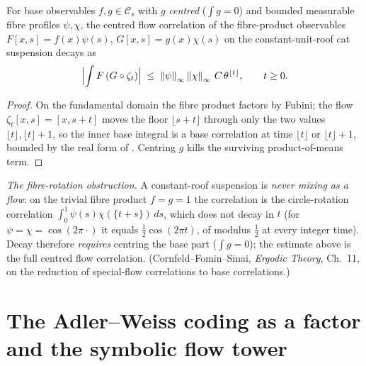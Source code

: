 \begin{theorem}\label{catSuspensionDecay_fourierDecay}
  \leanok
  For base observables \(f, g\in\mathcal C_s\) with \(g\) \emph{centred} (\(\int g = 0\)) and bounded
  measurable fibre profiles \(\psi, \chi\), the centred flow correlation of the fibre-product
  observables \(F[x,s] = f(x)\psi(s)\), \(G[x,s] = g(x)\chi(s)\) on the constant-unit-roof cat
  suspension decays as
  \[
    \Bigl\lvert \int F\,(G\circ\zeta_t) \Bigr\rvert
      \;\le\; \left\lVert \psi \right\rVert_\infty\left\lVert \chi \right\rVert_\infty\, C\,\theta^{\lfloor t\rfloor}, \qquad t\ge 0.
  \]
\end{theorem}
\begin{proof}\leanok
  On the fundamental domain the fibre product factors by Fubini; the flow \(\zeta_t[x,s] = [x, s+t]\)
  moves the floor \(\lfloor s+t\rfloor\) through only the two values \(\lfloor t\rfloor,
  \lfloor t\rfloor + 1\), so the inner base integral is a base correlation at time \(\lfloor t\rfloor\)
  or \(\lfloor t\rfloor + 1\), bounded by the real form of . Centring \(g\) kills
  the surviving product-of-means term.
\end{proof}

\emph{The fibre-rotation obstruction.} A constant-roof suspension is \emph{never mixing as a flow}:
on the trivial fibre product \(f = g = 1\) the correlation is the circle-rotation correlation
\(\int_0^1\psi(s)\chi(\{t+s\})\,ds\), which does not decay in \(t\) (for \(\psi = \chi = \cos(2\pi\cdot)\)
it equals \(\tfrac12\cos(2\pi t)\), of modulus \(\tfrac12\) at every integer time). Decay therefore
\emph{requires} centring the base part (\(\int g = 0\)); the estimate above is the full centred flow
correlation. (Cornfeld--Fomin--Sinai, \emph{Ergodic Theory}, Ch.~11, on the reduction of special-flow
correlations to base correlations.)

\section{The Adler--Weiss coding as a factor and the symbolic flow tower}\label{sec:catSymbolicTower}

